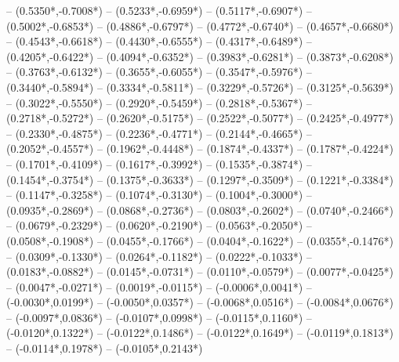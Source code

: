 {	-- ({0.5350*\dx},{-0.7008*\dy})
	-- ({0.5233*\dx},{-0.6959*\dy})
	-- ({0.5117*\dx},{-0.6907*\dy})
	-- ({0.5002*\dx},{-0.6853*\dy})
	-- ({0.4886*\dx},{-0.6797*\dy})
	-- ({0.4772*\dx},{-0.6740*\dy})
	-- ({0.4657*\dx},{-0.6680*\dy})
	-- ({0.4543*\dx},{-0.6618*\dy})
	-- ({0.4430*\dx},{-0.6555*\dy})
	-- ({0.4317*\dx},{-0.6489*\dy})
	-- ({0.4205*\dx},{-0.6422*\dy})
	-- ({0.4094*\dx},{-0.6352*\dy})
	-- ({0.3983*\dx},{-0.6281*\dy})
	-- ({0.3873*\dx},{-0.6208*\dy})
	-- ({0.3763*\dx},{-0.6132*\dy})
	-- ({0.3655*\dx},{-0.6055*\dy})
	-- ({0.3547*\dx},{-0.5976*\dy})
	-- ({0.3440*\dx},{-0.5894*\dy})
	-- ({0.3334*\dx},{-0.5811*\dy})
	-- ({0.3229*\dx},{-0.5726*\dy})
	-- ({0.3125*\dx},{-0.5639*\dy})
	-- ({0.3022*\dx},{-0.5550*\dy})
	-- ({0.2920*\dx},{-0.5459*\dy})
	-- ({0.2818*\dx},{-0.5367*\dy})
	-- ({0.2718*\dx},{-0.5272*\dy})
	-- ({0.2620*\dx},{-0.5175*\dy})
	-- ({0.2522*\dx},{-0.5077*\dy})
	-- ({0.2425*\dx},{-0.4977*\dy})
	-- ({0.2330*\dx},{-0.4875*\dy})
	-- ({0.2236*\dx},{-0.4771*\dy})
	-- ({0.2144*\dx},{-0.4665*\dy})
	-- ({0.2052*\dx},{-0.4557*\dy})
	-- ({0.1962*\dx},{-0.4448*\dy})
	-- ({0.1874*\dx},{-0.4337*\dy})
	-- ({0.1787*\dx},{-0.4224*\dy})
	-- ({0.1701*\dx},{-0.4109*\dy})
	-- ({0.1617*\dx},{-0.3992*\dy})
	-- ({0.1535*\dx},{-0.3874*\dy})
	-- ({0.1454*\dx},{-0.3754*\dy})
	-- ({0.1375*\dx},{-0.3633*\dy})
	-- ({0.1297*\dx},{-0.3509*\dy})
	-- ({0.1221*\dx},{-0.3384*\dy})
	-- ({0.1147*\dx},{-0.3258*\dy})
	-- ({0.1074*\dx},{-0.3130*\dy})
	-- ({0.1004*\dx},{-0.3000*\dy})
	-- ({0.0935*\dx},{-0.2869*\dy})
	-- ({0.0868*\dx},{-0.2736*\dy})
	-- ({0.0803*\dx},{-0.2602*\dy})
	-- ({0.0740*\dx},{-0.2466*\dy})
	-- ({0.0679*\dx},{-0.2329*\dy})
	-- ({0.0620*\dx},{-0.2190*\dy})
	-- ({0.0563*\dx},{-0.2050*\dy})
	-- ({0.0508*\dx},{-0.1908*\dy})
	-- ({0.0455*\dx},{-0.1766*\dy})
	-- ({0.0404*\dx},{-0.1622*\dy})
	-- ({0.0355*\dx},{-0.1476*\dy})
	-- ({0.0309*\dx},{-0.1330*\dy})
	-- ({0.0264*\dx},{-0.1182*\dy})
	-- ({0.0222*\dx},{-0.1033*\dy})
	-- ({0.0183*\dx},{-0.0882*\dy})
	-- ({0.0145*\dx},{-0.0731*\dy})
	-- ({0.0110*\dx},{-0.0579*\dy})
	-- ({0.0077*\dx},{-0.0425*\dy})
	-- ({0.0047*\dx},{-0.0271*\dy})
	-- ({0.0019*\dx},{-0.0115*\dy})
	-- ({-0.0006*\dx},{0.0041*\dy})
	-- ({-0.0030*\dx},{0.0199*\dy})
	-- ({-0.0050*\dx},{0.0357*\dy})
	-- ({-0.0068*\dx},{0.0516*\dy})
	-- ({-0.0084*\dx},{0.0676*\dy})
	-- ({-0.0097*\dx},{0.0836*\dy})
	-- ({-0.0107*\dx},{0.0998*\dy})
	-- ({-0.0115*\dx},{0.1160*\dy})
	-- ({-0.0120*\dx},{0.1322*\dy})
	-- ({-0.0122*\dx},{0.1486*\dy})
	-- ({-0.0122*\dx},{0.1649*\dy})
	-- ({-0.0119*\dx},{0.1813*\dy})
	-- ({-0.0114*\dx},{0.1978*\dy})
	-- ({-0.0105*\dx},{0.2143*\dy})
}
